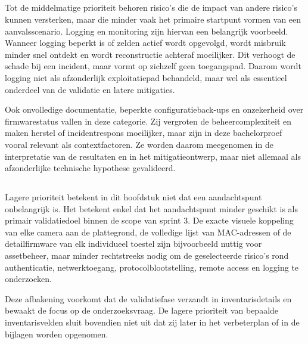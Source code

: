 \subsection{}%
\label{subsec:risico-middel}

Tot de middelmatige prioriteit behoren risico's die de impact van andere risico's kunnen versterken, maar die minder vaak het primaire startpunt vormen van een aanvalsscenario. Logging en monitoring zijn hiervan een belangrijk voorbeeld. Wanneer logging beperkt is of zelden actief wordt opgevolgd, wordt misbruik minder snel ontdekt en wordt reconstructie achteraf moeilijker. Dit verhoogt de schade bij een incident, maar vormt op zichzelf geen toegangspad. Daarom wordt logging niet als afzonderlijk exploitatiepad behandeld, maar wel als essentieel onderdeel van de validatie en latere mitigaties.

Ook onvolledige documentatie, beperkte configuratieback-ups en onzekerheid over firmwarestatus vallen in deze categorie. Zij vergroten de beheercomplexiteit en maken herstel of incidentrespons moeilijker, maar zijn in deze bachelorproef vooral relevant als contextfactoren. Ze worden daarom meegenomen in de interpretatie van de resultaten en in het mitigatieontwerp, maar niet allemaal als afzonderlijke technische hypothese gevalideerd.



\subsection{}%
\label{subsec:risico-laag}

Lagere prioriteit betekent in dit hoofdstuk niet dat een aandachtspunt onbelangrijk is. Het betekent enkel dat het aandachtspunt minder geschikt is als primair validatiedoel binnen de scope van sprint 3. De exacte visuele koppeling van elke camera aan de plattegrond, de volledige lijst van MAC-adressen of de detailfirmware van elk individueel toestel zijn bijvoorbeeld nuttig voor assetbeheer, maar minder rechtstreeks nodig om de geselecteerde risico's rond authenticatie, netwerktoegang, protocolblootstelling, remote access en logging te onderzoeken.

Deze afbakening voorkomt dat de validatiefase verzandt in inventarisdetails en bewaakt de focus op de onderzoeksvraag. De lagere prioriteit van bepaalde inventarisvelden sluit bovendien niet uit dat zij later in het verbeterplan of in de bijlagen worden opgenomen.



